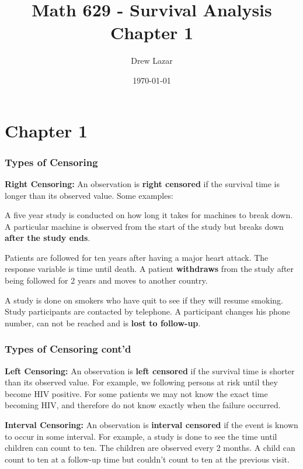\documentclass{beamer}
\title{Math 629 - Survival Analysis \\ Chapter 1}
\author{Drew Lazar}
\institute{Ball State University}
\date{\today}
\theoremstyle{definition}
\begin{document}
\begin{frame}
    \titlepage
\end{frame}
\section{Chapter 1}
\begin{frame}\frametitle{Types of Censoring}
\bn
\item \textbf{Right Censoring:} An observation is \textbf{right censored} if the survival time is longer than its observed value. Some examples:
\bni
\item A five year study is conducted on how long it takes for machines to break down. A particular machine is observed from the start of the study but breaks down \textbf{after the study ends}.
\item Patients are followed for ten years after having a major heart attack. The response variable is time until death. A patient \textbf{withdraws} from the study after being followed for 2 years and moves to another country.
\item A study is done on smokers who have quit to see if they will resume smoking. Study participants are contacted by telephone. A participant changes his phone number, can not be reached and is \textbf{lost to follow-up}.
\en
\en
\end{frame}
\begin{frame} \frametitle{Types of Censoring cont'd}

\bn \setcounter{enumi}{2}
\item \textbf{Left Censoring:} An observation is \textbf{left censored} if the survival time is shorter than its observed value. For example, we following persons at risk until they become HIV positive.  For some patients we may not know the exact time becoming HIV, and therefore do not know exactly when the failure occurred.
\item \textbf{Interval Censoring:} An observation is \textbf{interval censored} if the event is known to occur in some interval. For example, a study is done to see the time until children can count to ten. The children are observed every 2 months. A child can count to ten at a follow-up time but couldn't count to ten at the previous visit.
\en
\end{frame}
\end{document}
